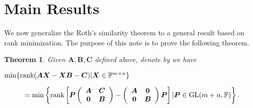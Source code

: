 \documentclass[preprint,12pt,authoryear]{elsarticle}
\theoremstyle{cupthm}
\newtheorem{thm}{Theorem}[section]
\theoremstyle{cupdefn}
\theoremstyle{cuprem}
\numberwithin{equation}{section}
\begin{document}
\section{Main Results}
We now generalize the Roth's similarity theorem to a general result based on rank minimization. The purpose of this note is to prove the following theorem.
\begin{thm} Given $\bm{A},\bm{B},\bm{C}$ defined above, denote by we have
\\
\centerline{
$
\min
\{
\textnormal{rank}
(\bm{A}\bm{X}-\bm{X}\bm{B}-\bm{C})
|
\bm{X}\in\mathbb{F}^{m\times n}
\}
$
}
\[
=
\min
\left\{
\textnormal{rank}
\left[
\bm{P}
\left(
\begin{array}{cc}
\bm{A} & \bm{C} \\
\bm{0} & \bm{B}
\end{array}
\right)
-
\left(
\begin{array}{cc}
\bm{A} & \bm{0} \\
\bm{0} & \bm{B}
\end{array}
\right)
\bm{P}
\right]
|
\bm{P}
\in
\textnormal{GL}(m+n,\mathbb{F})
\right\}
.
\]
\end{thm}
\end{document}
